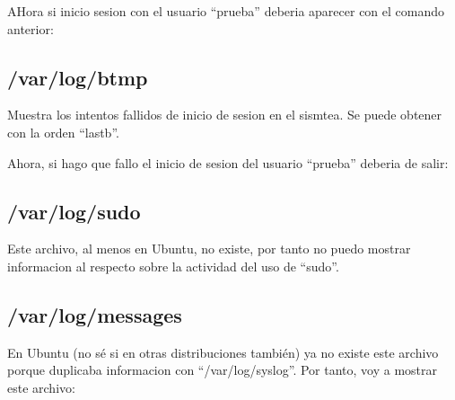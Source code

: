 \documentclass{article}
\begin{document}

AHora si inicio sesion con el usuario ``prueba'' deberia aparecer con el comando anterior:

\subsection{/var/log/btmp}
Muestra los intentos fallidos de inicio de sesion en el sismtea. Se puede obtener con la orden ``lastb''.


Ahora, si hago que fallo el inicio de sesion del usuario ``prueba'' deberia de salir:

\subsection{/var/log/sudo}
Este archivo, al menos en Ubuntu, no existe, por tanto no puedo mostrar informacion al respecto sobre la actividad del uso de ``sudo''.
\subsection{/var/log/messages}
En Ubuntu (no sé si en otras distribuciones también) ya no existe este archivo porque duplicaba informacion con ``/var/log/syslog''. Por tanto, voy a mostrar este archivo:

\end{document}
